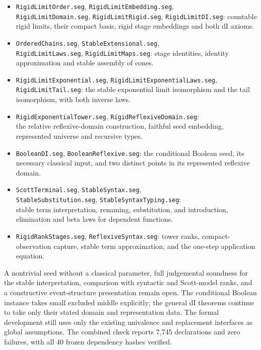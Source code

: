 \documentclass[11pt]{article}
\begin{document}
\begin{itemize}
embedding constructors, stable conjugation, exponential lifting,
compactness and bounded-join preservation.
\item \texttt{RigidLimitOrder.seg}, \texttt{RigidLimitEmbedding.seg},\\
\texttt{RigidLimitDomain.seg}, \texttt{RigidLimitRigid.seg},
\texttt{RigidLimitDI.seg}: countable rigid limits, their compact basis,
rigid stage embeddings and both dI axioms.
\item \texttt{OrderedChains.seg}, \texttt{StableExtensional.seg},\\
\texttt{RigidLimitLaws.seg}, \texttt{RigidLimitMaps.seg}: stage identities,
identity approximation and stable assembly of cones.
\item \texttt{RigidLimitExponential.seg},
\texttt{RigidLimitExponentialLaws.seg},\\
\texttt{RigidLimitTail.seg}: the stable exponential limit isomorphism
and the tail isomorphism, with both inverse laws.
\item \texttt{RigidExponentialTower.seg}, \texttt{RigidReflexiveDomain.seg}:\\
the relative reflexive-domain construction, faithful seed embedding,
represented universe and recursive types.
\item \texttt{BooleanDI.seg}, \texttt{BooleanReflexive.seg}: the conditional
Boolean seed, its necessary classical input, and two distinct points
in its represented reflexive domain.
\item \texttt{ScottTerminal.seg}, \texttt{StableSyntax.seg},\\
\texttt{StableSubstitution.seg}, \texttt{StableSyntaxTyping.seg}:\\
stable term interpretation, renaming, substitution, and introduction,
elimination and beta laws for dependent functions.
\item \texttt{RigidRankStages.seg}, \texttt{ReflexiveSyntax.seg}: tower ranks,
compact-observation capture, stable term approximation, and the
one-step application equation.
\end{itemize}

A nontrivial seed without a classical parameter, full judgemental
soundness for the stable interpretation, comparison with syntactic and
Scott-model ranks, and a constructive event-structure presentation
remain open. The conditional Boolean instance takes small excluded
middle explicitly; the general dI theorems continue to take only their
stated domain and representation data.
The formal development still uses only the existing univalence and
replacement interfaces as global assumptions. The combined check
reports 7,745 declarations and zero failures, with all 40 frozen
dependency hashes verified.
\end{document}
